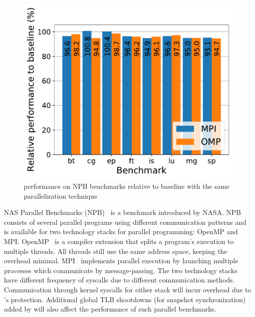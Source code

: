 \documentclass[letterpaper,twocolumn,10pt, anonymous]{article}
\begin{document}
\begin{figure}[]
  \includegraphics[width=\linewidth]{img/npb_performance.pdf}
  \caption{\tiktok performance on NPB benchmarks relative to baseline with 
          the same parallelization technique}
  \label{fig:npb_performance}
\end{figure}

NAS Parallel Benchmarks (NPB)~\cite{npb} is a benchmark introduced by
NASA. 
NPB consists of several parallel programs using different communication
patterns and is available for two technology stacks for parallel programming:
OpenMP and MPI.
OpenMP~\cite{dagum1998openmp} is a compiler extension that splits a 
program's execution to multiple threads. 
All threads still use the same address space, keeping the overhead minimal. 
MPI~\cite{snir1998mpi} implements parallel execution by launching multiple
processes which communicate by message-passing. 
The two technology stacks have different frequency of syscalls due to 
different communication methods.
Communication through kernel syscalls for either stack will incur overhead
due to \tiktok's protection.
Additional global TLB shootdowns (for snapshot synchronization) added by \tiktok will also affect the 
performance of such parallel benchmarks.
\end{document}
